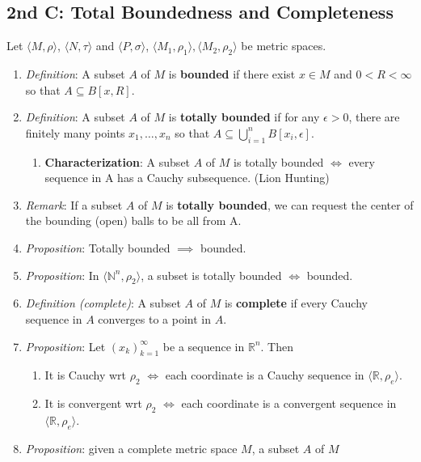 \documentclass[10pt]{article}
\newcommand{\met}[1]{\langle M_{#1},\rho_{#1}\rangle}
\begin{document}
\begin{multicols*}{3}
	\section{2nd C: Total Boundedness and Completeness}
	Let \(\langle M,\rho\rangle\), \(\langle N,\tau\rangle\) and
	\(\langle P,\sigma\rangle\), $\met{1}, \met{2}$ be metric spaces.
	\begin{enumerate}
		\item \emph{Definition}: A subset \(A\) of \(M\) is \textbf{bounded} if
			there exist \(x \in M\) and \(0<R<\infty\) so that \(A \subseteq B[x,R]\).
		\item \emph{Definition}: A subset \(A\) of \(M\) is \textbf{totally bounded}
			if for any \(\epsilon > 0\), there are finitely many points
			\(x_1,\dots,x_n\) so that \(A \subseteq \bigcup^n_{i=1}B[x_i,\epsilon]\).
			\begin{enumerate}
				\item \textbf{Characterization}: A subset \(A\) of \(M\) is totally bounded
					\(\iff\) every sequence in A has a Cauchy subsequence. (Lion Hunting)
			\end{enumerate}
		\item \emph{Remark}: If a subset \(A\) of \(M\) is \textbf{totally bounded}, we can request the
		      center of the bounding (open) balls to be all from A.
		\item \emph{Proposition}: Totally bounded \(\implies\) bounded.
		\item \emph{Proposition}: In \(\langle\mathbb{N}^n,\rho_2\rangle\), a subset is totally
		      bounded \(\iff\) bounded.
		\item \emph{Definition (complete)}: A subset \(A\) of \(M\) is \textbf{complete} if every Cauchy
		      sequence in \(A\) converges to a point in \(A\).
		\item \emph{Proposition}: Let \((x_k)^\infty_{k=1}\) be a sequence in \(\mathbb{R}^n\).
		      Then
		      \begin{enumerate}
			      \item It is Cauchy wrt \(\rho_2\) \(\iff\) each coordinate is a Cauchy
			            sequence in \(\langle\mathbb{R},\rho_e\rangle\).
			      \item It is convergent wrt \(\rho_2\) \(\iff\) each coordinate is a convergent
			            sequence in \(\langle\mathbb{R},\rho_e\rangle\).
		      \end{enumerate}
		\item \emph{Proposition}: given a complete metric space \(M\), a subset \(A\) of \(M\)

\end{enumerate}
\end{multicols*}
\end{document}

